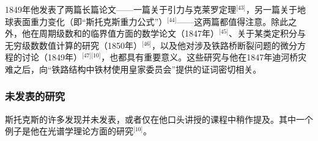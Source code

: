 1849年他发表了两篇长篇论文——一篇关于引力与克莱罗定理\(^\text{[43]}\)，另一篇关于地球表面重力变化（即“斯托克斯重力公式”）\(^\text{[44]}\)——这两篇都值得注意。除此之外，他在周期级数和的临界值方面的数学论文（1847年）\(^\text{[45]}\)、关于某类定积分与无穷级数数值计算的研究（1850年）\(^\text{[46]}\)，以及他对涉及铁路桥断裂问题的微分方程的讨论（1849年）\(^\text{[47][10]}\)，也都具有重要意义。这些研究与他在1847年迪河桥灾难之后，向“铁路结构中铁材使用皇家委员会”提供的证词密切相关。
\subsubsection{未发表的研究}
斯托克斯的许多发现并未发表，或者仅在他口头讲授的课程中稍作提及。其中一个例子是他在光谱学理论方面的研究\(^\text{[10]}\)。
